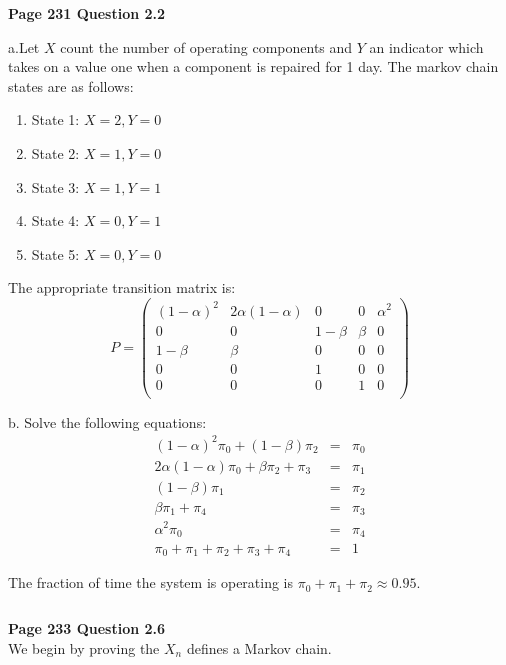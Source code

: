 \documentclass[10pt,a4paper]{article}
\begin{document}
\begin{flushleft}

\begin{eqnarray*}
\\
\end{eqnarray*}


\textbf{Page 231 Question 2.2}

a.Let $X$ count the number of operating components and $Y$ an
indicator which takes on a value one when a component is repaired
for 1 day. The markov chain states are as follows:
\begin{enumerate}
    \item  State 1: $X=2,Y=0$
    \item  State 2: $X=1,Y=0$
    \item  State 3: $X=1,Y=1$
    \item  State 4: $X=0,Y=1$
    \item  State 5: $X=0,Y=0$
\end{enumerate}

The appropriate transition matrix is:
\[ P =   \left ( \begin{array}{ccccc}
 (1-\alpha)^2 & 2\alpha(1-\alpha) & 0 & 0 & \alpha^2 \\
 0 & 0 & 1-\beta & \beta & 0  \\
  1-\beta &  \beta& 0 & 0 & 0 \\
 0 & 0 & 1 & 0 & 0  \\
 0 & 0 & 0 & 1 & 0  \\
\end{array} \right) \]

b. Solve the following equations:
\begin{eqnarray*}
(1-\alpha)^2 \pi_0+ (1-\beta) \pi_2&=&\pi_0\\
2\alpha(1-\alpha) \pi_0+\beta \pi_2 + \pi_3 &=& \pi_1\\
(1-\beta) \pi_1 &=& \pi_2\\
\beta \pi_1+\pi_4&=&\pi_3\\
\alpha^2 \pi_0 &=& \pi_4 \\
\pi_0 + \pi_1 + \pi_2 + \pi_3 + \pi_4 &=&1
\end{eqnarray*}

The fraction of time the system is operating is
$\pi_0+\pi_1+\pi_2\approx0.95$.
\begin{eqnarray*}
\\
\end{eqnarray*}



\textbf{Page 233 Question 2.6}\\
We begin by proving the $X_n$ defines a Markov chain.


\end{flushleft}
\end{document}
